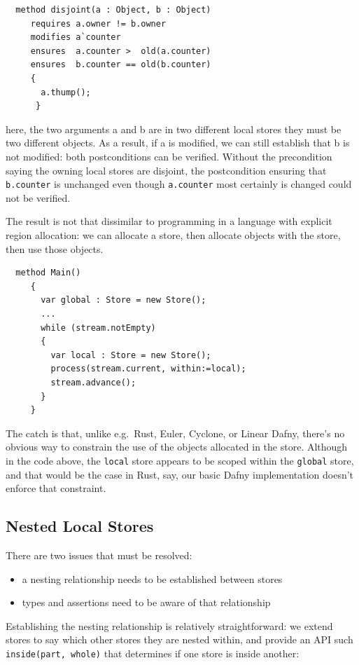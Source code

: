 \begin{lstlisting}
  method disjoint(a : Object, b : Object)
     requires a.owner != b.owner
     modifies a`counter
     ensures  a.counter >  old(a.counter)
     ensures  b.counter == old(b.counter)
     {
       a.thump();
      }
\end{lstlisting}

\noindent here, the two arguments a and b are in two different local stores 
they must be two different objects. As a result, if a is modified,
we can still establish that b is not modified: both postconditions can
be verified.  Without the precondition saying the owning local stores
are disjoint, the postcondition ensuring that \lstinline+b.counter+  is
unchanged even though  \lstinline+a.counter+ most certainly is changed
could not be verified.

The result is not that dissimilar to programming in a
language with explicit region allocation: we can allocate a store,
then allocate objects with the store, then use those objects.

\begin{lstlisting}
  method Main()
     {
       var global : Store = new Store();
       ...
       while (stream.notEmpty)
       {
         var local : Store = new Store();
         process(stream.current, within:=local);
         stream.advance();
       }
     }
\end{lstlisting}

The catch is that, unlike e.g.\ Rust, Euler, Cyclone, or Linear Dafny,
there's no obvious way to constrain the use of the objects allocated
in the store. Although in the code above, the \lstinline+local+ store
appears to be scoped within the \lstinline+global+ store, and that
would be the case in Rust, say, our basic Dafny implementation doesn't
enforce that constraint.

\subsection{Nested Local Stores}

There are two issues that must be resolved:
\begin{itemize}
\item a nesting relationship needs to be established between stores
\item types and assertions need to be aware of that relationship
\end{itemize}

\noindent Establishing the nesting relationship is relatively straightforward: 
we extend stores to say which other stores they are nested within,
and provide an API such \lstinline+inside(part, whole)+ that determines
if one store is inside another:

